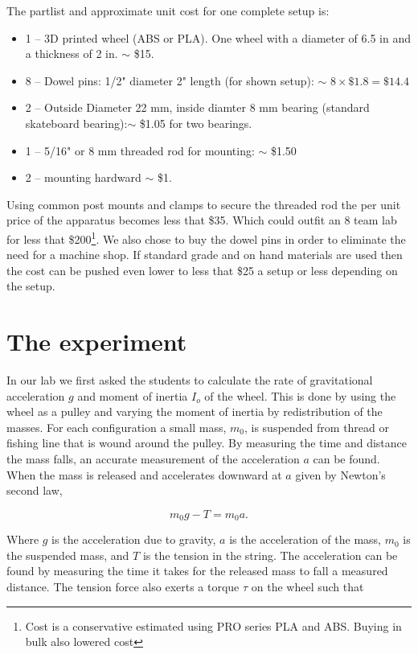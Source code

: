 \documentclass[prb,preprint]{revtex4-1}
\begin{document}
The partlist and approximate unit cost  for one complete setup is:
\begin{itemize}
\item 1 --  3D printed wheel (ABS or PLA).  One wheel with a diameter of 6.5 in and a thickness of 2 in. $\sim$   \$15.
\item 8 -- Dowel pins:  1/2" diameter 2" length (for shown setup):  $\sim$ $8 \times \$1.8 =\$14.4$  
\item 2 -- Outside Diameter 22 mm, inside diamter 8 mm bearing (standard skateboard bearing):$\sim$  \$1.05 for two bearings.
\item 1 -- 5/16" or 8 mm threaded rod for mounting:  $\sim$ \$1.50
\item 2 -- mounting hardward $\sim$ \$1.

\end{itemize}
Using common post mounts and clamps to secure the threaded rod the per unit price of the apparatus becomes less that \$35.  Which could outfit an 8 team lab for less that \$200\footnote{Cost is a conservative estimated using PRO series PLA and ABS.  Buying in bulk also lowered cost}.  We also chose to buy the dowel pins in order to eliminate the need for a machine shop.  If standard grade and on hand materials are used then the cost can be pushed even lower to less that \$25 a setup or less depending on the setup.

\section{The experiment}

In our lab we first asked the students to calculate the rate of gravitational acceleration $g$ and moment of inertia $I_o$ of the wheel.  This is done by using the wheel as a pulley and varying the moment of inertia by redistribution of the masses.  For each configuration a small mass, $m_0$, is suspended from thread or fishing line that is wound around the pulley. By measuring the time and distance the mass falls, an accurate measurement of the acceleration $a$ can be found. When the mass is released and accelerates downward at $a$ given by Newton's second law,

\begin{equation}
m_0g-T=m_0a.
\end{equation}

Where $g$ is the acceleration due to gravity, $a$ is the acceleration of the mass, $m_0$ is the suspended mass, and $T$ is the tension in the string. The acceleration can be found by measuring the time it takes for the released mass to fall a measured distance. The tension force also exerts a torque $\tau$ on the wheel such that 
\end{document}
